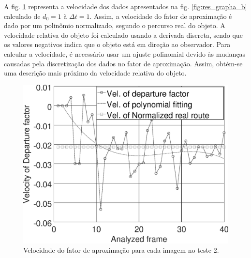 A fig. \ref{fig:res_grapha_bv} representa a velocidade dos dados apresentados 
na fig. \ref{fig:res_grapha_b} calculado de $d_0=1$ à $\Delta t=1$.
Assim, a velocidade do fator de aproximação é dado por um polinômio
normalizado, segundo o percurso real do objeto.
A velocidade relativa do objeto foi calculado usando a derivada
discreta, sendo que os valores negativos indica que o objeto está
em direção ao observador. 
Para calcular a velocidade, é necessário usar um ajuste polinomial devido 
às mudanças causadas pela discretização dos dados no fator de aproximação.
Assim, obtém-se uma descrição mais próximo da velocidade relativa do 
objeto.

\begin{figure}[!hbt]
\includegraphics[width=\columnwidth]{images/graphvelocity.eps}
\caption{Velocidade do fator de aproximação para cada imagem no teste 2.}
\label{fig:res_grapha_bv}
\end{figure}